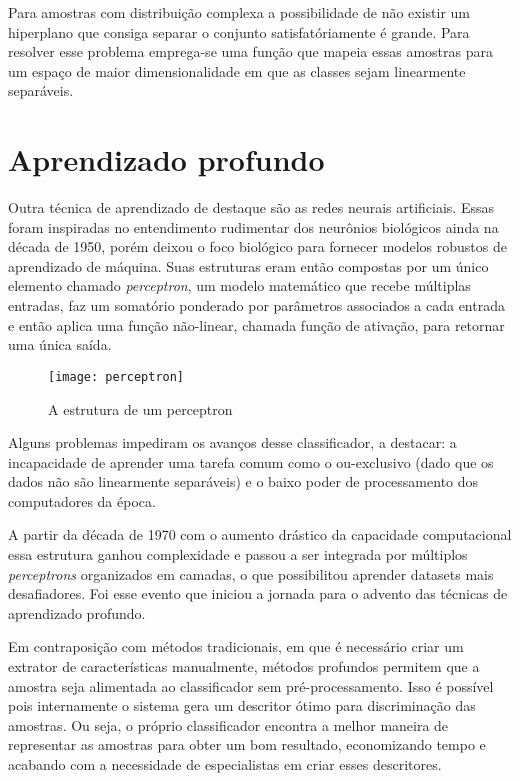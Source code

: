 Para amostras com distribuição complexa a possibilidade de não existir um hiperplano que consiga separar o conjunto satisfatóriamente é grande. Para resolver esse problema emprega-se uma função que mapeia essas amostras para um espaço de maior dimensionalidade em que as classes sejam linearmente separáveis.

\section{Aprendizado profundo}
Outra técnica de aprendizado de destaque são as redes neurais artificiais. Essas foram inspiradas no entendimento rudimentar dos neurônios biológicos ainda na década de 1950, porém deixou o foco biológico para fornecer modelos robustos de aprendizado de máquina. Suas estruturas eram então compostas por um único elemento chamado \textit{perceptron}, um modelo matemático que recebe múltiplas entradas, faz um somatório ponderado por parâmetros associados a cada entrada e então aplica uma função não-linear, chamada função de ativação, para retornar uma única saída.

\begin{figure}[h]
\centering
\texttt{[image: perceptron]}
\caption{A estrutura de um perceptron}
\label{fig:perceptron}
\end{figure}

Alguns problemas impediram os avanços desse classificador, a destacar: a incapacidade de aprender uma tarefa comum como o ou-exclusivo (dado que os dados não são linearmente separáveis) e o baixo poder de processamento dos computadores da época.

A partir da década de 1970 com o aumento drástico da capacidade computacional essa estrutura ganhou complexidade e passou a ser integrada por múltiplos \textit{perceptrons} organizados em camadas, o que possibilitou aprender datasets mais desafiadores. Foi esse evento que iniciou a jornada para o advento das técnicas de aprendizado profundo.

Em contraposição com métodos tradicionais, em que é necessário criar um extrator de características manualmente, métodos profundos permitem que a amostra seja alimentada ao classificador sem pré-processamento. Isso é possível pois internamente o sistema gera um descritor ótimo para discriminação das amostras. Ou seja, o próprio classificador encontra a melhor maneira de representar as amostras para obter um bom resultado, economizando tempo e acabando com a necessidade de especialistas em criar esses descritores. %

